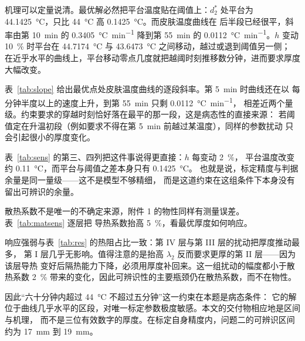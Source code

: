 \documentclass[withoutpreface,bwprint]{cumcmthesis}
\begin{document}
机理可以定量说清。最优解必然把平台温度贴在阈值上：$d_2^{*}$ 处平台为
\SI{44.1425}{\celsius}，只比 \SI{44}{\celsius} 高 \SI{0.1425}{\celsius}。而皮肤温度曲线在
后半段已经很平，斜率由第 \SI{10}{min} 的 \SI{0.3405}{\celsius\per\minute} 降到第
\SI{55}{min} 的 \SI{0.0112}{\celsius\per\minute}。$h$ 变动 \SI{10}{\percent} 时平台在
\SI{44.7174}{\celsius} 与 \SI{43.6473}{\celsius} 之间移动，越过或退到阈值另一侧；
在近乎水平的曲线上，平台移动零点几度就把越阈时刻推移数分钟，进而要求厚度大幅改变。

表~\ref{tab:slope} 给出最优点处皮肤温度曲线的逐段斜率。第 \SI{5}{min} 时曲线还在以
每分钟半度以上的速度上升，到第 \SI{55}{min} 只剩 \SI{0.0112}{\celsius\per\minute}，
相差近两个量级。约束要求的穿越时刻恰好落在最平的那一段，这是病态性的直接来源：
若阈值定在升温初段（例如要求不得在第 \SI{5}{min} 前越过某温度），同样的参数扰动
只会引起很小的厚度变化。

\begin{table}[htbp]
  \centering
  \caption{最优点处皮肤外侧温度的逐段斜率（\SI{65}{\celsius}，$d_2=\SI{18.16}{mm}$）}
  \label{tab:slope}
  
\end{table}

表~\ref{tab:sens} 的第三、四列把这件事说得更直接：$h$ 每变动 \SI{2}{\percent}，
平台温度改变约 \SI{0.11}{\celsius}，而平台与阈值之差本身只有 \SI{0.1425}{\celsius}。
也就是说，标定精度与判据余量是同一量级——这不是模型不够精细，
而是这道约束在这组条件下本身没有留出可辨识的余量。

散热系数不是唯一的不确定来源，附件 1 的物性同样有测量误差。表~\ref{tab:matsens} 逐层把
导热系数抬高 \SI{5}{\percent}，看最优厚度如何响应。

\begin{table}[htbp]
  \centering
  \caption{逐层导热系数各抬高 \SI{5}{\percent} 时问题二最优厚度的变化}
  \label{tab:matsens}
  
\end{table}

响应强弱与表~\ref{tab:res} 的热阻占比一致：第 IV 层与第 III 层的扰动把厚度推动最多，
第 I 层几乎无影响。值得注意的是抬高 $\lambda_2$ 反而要求更厚的第 II 层——因为该层导热
变好后隔热能力下降，必须用厚度补回来。这一组扰动的幅度都小于散热系数 \SI{2}{\percent}
带来的变化，因此可辨识性的主要瓶颈仍在散热系数，而不在物性。

因此“六十分钟内超过 \SI{44}{\celsius} 不超过五分钟”这一约束在本题是病态条件：
它的解位于曲线几乎水平的区段，对唯一标定参数极度敏感。本文的交付物相应地是区间与机理，
而不是三位有效数字的厚度。在标定自身精度内，问题二的可辨识区间约为 \SI{17}{mm} 到
\SI{19}{mm}。
\end{document}
